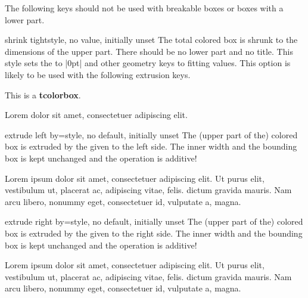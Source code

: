 \clearpage
\begin{marker}
The following keys should not be used with breakable boxes or boxes with a
lower part.
\end{marker}

\begin{docTcbKey}{shrink tight}{}{style, no value, initially unset}
  The total colored box is shrunk to the dimensions of the upper
  part. There should be no lower part and no title.
  This style sets the  to |0pt| and other geometry keys
  to fitting values. This option is likely to be used with the following
  extrusion keys.
\begin{dispExample}

\begin{tcolorbox}
This is a \textbf{tcolorbox}.
\end{tcolorbox}

Lorem  dolor sit amet, consectetuer adipiscing elit.
\end{dispExample}
\end{docTcbKey}

\begin{docTcbKey}[][doc updated=2014-09-19]{extrude left by}{=}{style, no default, initially unset}
  The (upper part of the) colored box is extruded by the given  to the left side.
  The inner width and the bounding box is kept unchanged and the operation
  is additive!
\begin{dispExample}

Lorem ipsum dolor sit amet, consectetuer adipiscing elit. Ut purus elit,
vestibulum ut, placerat ac, adipiscing vitae, felis.
 dictum gravida mauris.
Nam arcu libero, nonummy eget, consectetuer id, vulputate a, magna.
\end{dispExample}
\end{docTcbKey}

\begin{docTcbKey}[][doc updated=2014-09-19]{extrude right by}{=}{style, no default, initially unset}
  The (upper part of the) colored box is extruded by the given  to the right side.
  The inner width and the bounding box is kept unchanged and the operation
  is additive!
\begin{dispExample}

Lorem ipsum dolor sit amet, consectetuer adipiscing elit. Ut purus elit,
vestibulum ut, placerat ac, adipiscing vitae, felis.
 dictum gravida mauris.
Nam arcu libero, nonummy eget, consectetuer id, vulputate a, magna.
\end{dispExample}
\end{docTcbKey}

